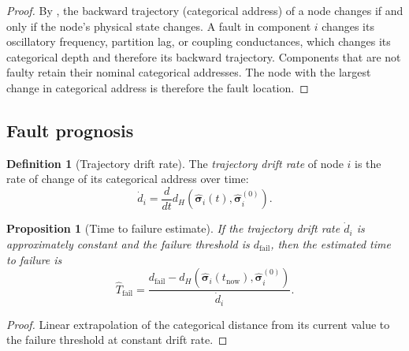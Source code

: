 \documentclass[twocolumn,10pt,a4paper]{article}
\newtheorem{proposition}[theorem]{Proposition}
\theoremstyle{definition}
\newtheorem{definition}[theorem]{Definition}
\theoremstyle{remark}
\newcommand{\vect}[1]{\boldsymbol{#1}}
\begin{document}
\begin{proof}
By , the backward trajectory (categorical address) of a node changes if and only if the node's physical state changes. A fault in component $i$ changes its oscillatory frequency, partition lag, or coupling conductances, which changes its categorical depth and therefore its backward trajectory. Components that are not faulty retain their nominal categorical addresses. The node with the largest change in categorical address is therefore the fault location.
\end{proof}

\subsection{Fault prognosis}

\begin{definition}[Trajectory drift rate]\label{def:drift_rate}
The \emph{trajectory drift rate} of node $i$ is the rate of change of its categorical address over time:
\begin{equation}\label{eq:drift_rate}
\dot{d}_i = \frac{d}{dt} d_H(\hat{\vect{\sigma}}_i(t), \hat{\vect{\sigma}}_i^{(0)}).
\end{equation}
\end{definition}

\begin{proposition}[Time to failure estimate]\label{prop:ttf}
If the trajectory drift rate $\dot{d}_i$ is approximately constant and the failure threshold is $d_{\mathrm{fail}}$, then the estimated time to failure is
\begin{equation}\label{eq:ttf}
\hat{T}_{\mathrm{fail}} = \frac{d_{\mathrm{fail}} - d_H(\hat{\vect{\sigma}}_i(t_{\mathrm{now}}), \hat{\vect{\sigma}}_i^{(0)})}{\dot{d}_i}.
\end{equation}
\end{proposition}

\begin{proof}
Linear extrapolation of the categorical distance from its current value to the failure threshold at constant drift rate.
\end{proof}
\end{document}
